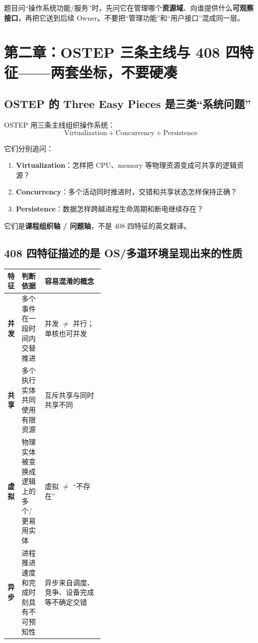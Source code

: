 \documentclass[11pt,a4paper]{ctexart}
\newcommand{\kw}[1]{\textbf{#1}}
\begin{document}
\begin{exam}[功能题第一动作]
题目问“操作系统功能/服务”时，先问它在管理哪个\kw{资源域}、向谁提供什么\kw{可观察接口}，再把它送到后续 Owner。不要把“管理功能”和“用户接口”混成同一层。
\end{exam}

\section{第二章：OSTEP 三条主线与 408 四特征——两套坐标，不要硬凑}

\subsection{OSTEP 的 Three Easy Pieces 是三类“系统问题”}

OSTEP 用三条主线组织操作系统：
\[
\boxed{\text{Virtualization}+\text{Concurrency}+\text{Persistence}}
\]

它们分别追问：
\begin{enumerate}
  \item \kw{Virtualization}：怎样把 CPU、memory 等物理资源变成可共享的逻辑资源？
  \item \kw{Concurrency}：多个活动同时推进时，交错和共享状态怎样保持正确？
  \item \kw{Persistence}：数据怎样跨越进程生命周期和断电继续存在？
\end{enumerate}

它们是\kw{课程组织轴 / 问题轴}，不是 408 四特征的英文翻译。

\subsection{408 四特征描述的是 OS/多道环境呈现出来的性质}

\begin{center}
\small
\renewcommand{\arraystretch}{1.25}
\begin{tabularx}{\linewidth}{>{\bfseries}p{0.14\linewidth} p{0.24\linewidth} X}
\toprule
特征 & 判断依据 & 容易混淆的概念\\
\midrule
并发 & 多个事件在一段时间内交替推进 & 并发 $\neq$ 并行；单核也可并发\\
共享 & 多个执行实体共同使用有限资源 & 互斥共享与同时共享不同\\
虚拟 & 物理实体被变换成逻辑上的多个/更易用实体 & 虚拟 $\neq$ “不存在”\\
异步 & 进程推进速度和完成时刻具有不可预知性 & 异步来自调度、竞争、设备完成等不确定交错\\
\bottomrule
\end{tabularx}
\end{center}
\end{document}
